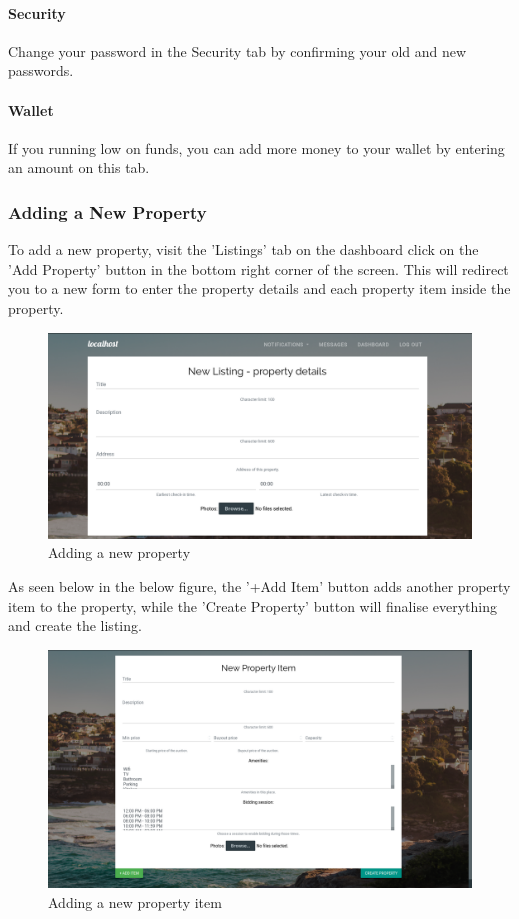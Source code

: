 \paragraph{Security}
Change your password in the Security tab by confirming your old and new passwords.

\paragraph{Wallet}
If you running low on funds, you can add more money to your wallet by entering
an amount on this tab.

\subsubsection{Adding a New Property}
To add a new property, visit the 'Listings' tab on the dashboard click on the
'Add Property' button in the bottom right corner of the screen. This will
redirect you to a new form to enter the property details and each property item
inside the property.

\begin{figure}[!h]
  \includegraphics[width=\linewidth]{assets/userManual/newProperty.png}
  \caption{Adding a new property}
  \label{fig:newProperty}
\end{figure}

As seen below in the below figure, the '+Add Item' button adds another property
item to the property, while the 'Create Property' button will finalise everything
and create the listing.

\begin{figure}[!h]
  \includegraphics[width=\linewidth]{assets/userManual/newPropertyItem.png}
  \caption{Adding a new property item}
  \label{fig:newPropertyItem}
\end{figure}
